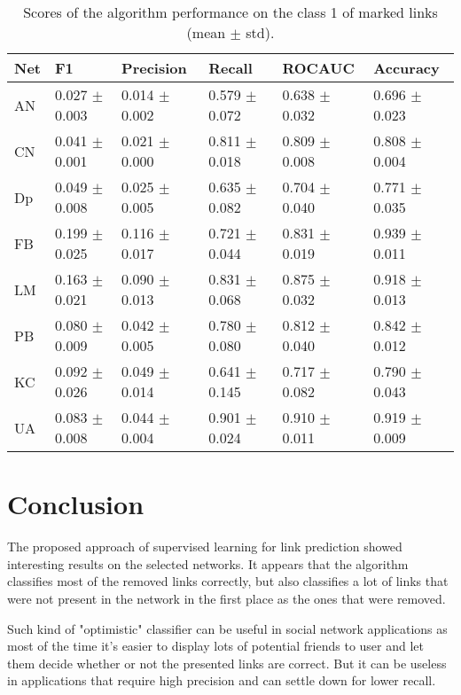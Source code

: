 \documentclass{llncs}
\begin{document}
%
\setlength{\tabcolsep}{5pt}
\renewcommand{\arraystretch}{1.5}
\begin{table}
\begin{center}
\caption{Scores of the algorithm performance on the class 1 of marked links (mean $\pm$ std).}
\begin{tabular}{| l | l | l | l | l | l |}
\hline
Net & F1 & Precision & Recall & ROCAUC & Accuracy  \\ \hline
AN & 0.027 $\pm$ 0.003 & 0.014 $\pm$ 0.002 & 0.579 $\pm$ 0.072 & 0.638 $\pm$ 0.032 & 0.696 $\pm$ 0.023  \\ \hline
CN & 0.041 $\pm$ 0.001 & 0.021 $\pm$ 0.000 & 0.811 $\pm$ 0.018 & 0.809 $\pm$ 0.008 & 0.808 $\pm$ 0.004  \\ \hline
Dp & 0.049 $\pm$ 0.008 & 0.025 $\pm$ 0.005 & 0.635 $\pm$ 0.082 & 0.704 $\pm$ 0.040 & 0.771 $\pm$ 0.035  \\ \hline
FB & 0.199 $\pm$ 0.025 & 0.116 $\pm$ 0.017 & 0.721 $\pm$ 0.044 & 0.831 $\pm$ 0.019 & 0.939 $\pm$ 0.011  \\ \hline
LM & 0.163 $\pm$ 0.021 & 0.090 $\pm$ 0.013 & 0.831 $\pm$ 0.068 & 0.875 $\pm$ 0.032 & 0.918 $\pm$ 0.013 \\ \hline
PB & 0.080 $\pm$ 0.009 & 0.042 $\pm$ 0.005 & 0.780 $\pm$ 0.080 & 0.812 $\pm$ 0.040 & 0.842 $\pm$ 0.012  \\ \hline
KC & 0.092 $\pm$ 0.026 & 0.049 $\pm$ 0.014 & 0.641 $\pm$ 0.145 & 0.717 $\pm$ 0.082 & 0.790 $\pm$  0.043 \\ \hline
UA & 0.083 $\pm$ 0.008 & 0.044 $\pm$ 0.004 & 0.901 $\pm$ 0.024 & 0.910 $\pm$ 0.011 & 0.919 $\pm$ 0.009  \\ 
\hline
\end{tabular}
\end{center}
\end{table}
%
\section{Conclusion}
%
The proposed approach of supervised learning for link prediction showed interesting results on the selected networks. It appears that the algorithm classifies most of the removed links correctly, but also classifies a lot of links that were not present in the network in the first place as the ones that were removed.

Such kind of "optimistic" classifier can be useful in social network applications as most of the time it's easier to display lots of potential friends to user and let them decide whether or not the presented links are correct. But it can be useless in applications that require high precision and can settle down for lower recall.
\end{document}
